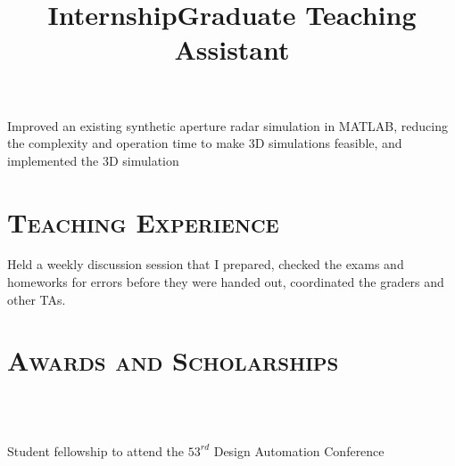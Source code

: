 \begin{resume}
	\title{Internship}
	\begin{position}
		Improved an existing synthetic aperture radar simulation in MATLAB, reducing
    the complexity and operation time to make 3D simulations feasible, and
    implemented the 3D simulation 
	\end{position}
	
	
	\section{\textsc{Teaching Experience}}
	
	\title{Graduate Teaching Assistant}
	\begin{position}
		Held a weekly discussion session that I prepared, checked the exams and
    homeworks for errors before they were handed out, coordinated the graders
    and other TAs. 
	\end{position}
	
	
	\section{\textsc{Awards and Scholarships}}
	
	\begin{formatb}
		\\
		\body\\
	\end{formatb}

  \begin{position}
    Student fellowship to attend the $53^{rd}$ Design Automation Conference
  \end{position}
	

\end{resume}
